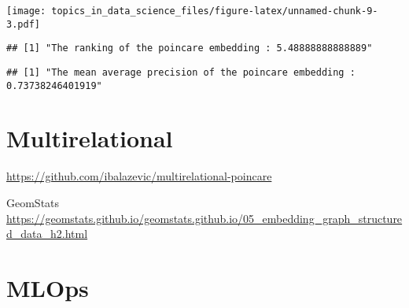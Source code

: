 \documentclass[
  11pt,
]{book}
\newenvironment{Shaded}{\begin{snugshade}}{\end{snugshade}}
\newcommand{\KeywordTok}[1]{\textcolor[rgb]{0.13,0.29,0.53}{\textbf{#1}}}
\newcommand{\NormalTok}[1]{#1}
\newcommand{\OperatorTok}[1]{\textcolor[rgb]{0.81,0.36,0.00}{\textbf{#1}}}
\newcommand{\StringTok}[1]{\textcolor[rgb]{0.31,0.60,0.02}{#1}}
\begin{document}
\texttt{[image: topics\_in\_data\_science\_files/figure-latex/unnamed-chunk-9-3.pdf]}

\begin{Shaded}
\end{Shaded}

\begin{verbatim}
## [1] "The ranking of the poincare embedding : 5.48888888888889"
\end{verbatim}

\begin{Shaded}
\end{Shaded}

\begin{verbatim}
## [1] "The mean average precision of the poincare embedding : 0.73738246401919"
\end{verbatim}

\hypertarget{multirelational}{%
\chapter{Multirelational}\label{multirelational}}

\url{https://github.com/ibalazevic/multirelational-poincare}

GeomStats
\url{https://geomstats.github.io/geomstats.github.io/05_embedding_graph_structured_data_h2.html}

\hypertarget{mlops}{%
\chapter{MLOps}\label{mlops}}
\end{document}
